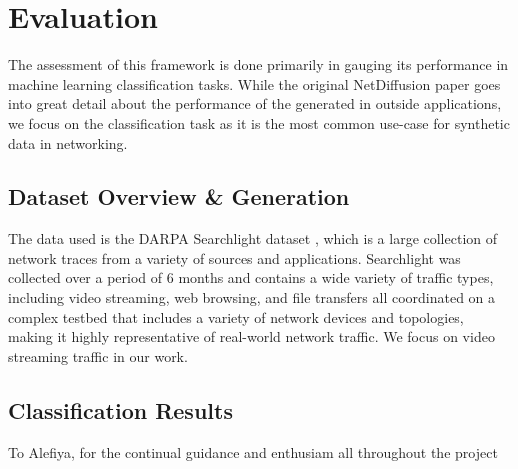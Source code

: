 \documentclass[acmsmall, nonacm]{acmart}
\begin{document}
\section{Evaluation}
The assessment of this framework is done primarily in gauging its performance
in machine learning classification tasks. While the original NetDiffusion paper
goes into great detail about the performance of the generated in outside
applications, we focus on the classification task as it is the most common
use-case for synthetic data in networking.

\subsection{Dataset Overview \& Generation}
The data used is the DARPA Searchlight dataset \cite{Ardi2022}, which is a large
collection of network traces from a variety of sources and applications. Searchlight
was collected over a period of 6 months and contains a wide variety of traffic types,
including video streaming, web browsing, and file transfers all coordinated on a 
complex testbed that includes a variety of network devices and topologies, making it
highly representative of real-world network traffic. We focus on video streaming
traffic in our work.

\subsection{Classification Results}

\begin{acks}
To Alefiya, for the continual guidance and enthusiam all throughout
the project
\end{acks}




\appendix
\end{document}
